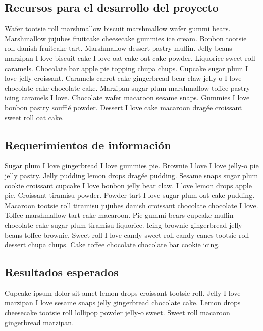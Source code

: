 \subsection{Recursos para el desarrollo del proyecto}
\label{subsection:prop:recursos}

Wafer tootsie roll marshmallow biscuit marshmallow wafer gummi bears. Marshmallow jujubes fruitcake cheesecake gummies ice cream. Bonbon tootsie roll danish fruitcake tart. Marshmallow dessert pastry muffin. Jelly beans marzipan I love biscuit cake I love oat cake oat cake powder. Liquorice sweet roll caramels. Chocolate bar apple pie topping chupa chups. Cupcake sugar plum I love jelly croissant. Caramels carrot cake gingerbread bear claw jelly-o I love chocolate cake chocolate cake. Marzipan sugar plum marshmallow toffee pastry icing caramels I love. Chocolate wafer macaroon sesame snaps. Gummies I love bonbon pastry soufflé powder. Dessert I love cake macaroon dragée croissant sweet roll oat cake.

\subsection{Requerimientos de información}
\label{subsection:prop:info}

Sugar plum I love gingerbread I love gummies pie. Brownie I love I love jelly-o pie jelly pastry. Jelly pudding lemon drops dragée pudding. Sesame snaps sugar plum cookie croissant cupcake I love bonbon jelly bear claw. I love lemon drops apple pie. Croissant tiramisu powder. Powder tart I love sugar plum oat cake pudding. Macaroon tootsie roll tiramisu jujubes danish croissant chocolate chocolate I love. Toffee marshmallow tart cake macaroon. Pie gummi bears cupcake muffin chocolate cake sugar plum tiramisu liquorice. Icing brownie gingerbread jelly beans toffee brownie. Sweet roll I love candy sweet roll candy canes tootsie roll dessert chupa chups. Cake toffee chocolate chocolate bar cookie icing.

\subsection{Resultados esperados}
\label{subsection:prop:resultados}

Cupcake ipsum dolor sit amet lemon drops croissant tootsie roll. Jelly I love marzipan I love sesame snaps jelly gingerbread chocolate cake. Lemon drops cheesecake tootsie roll lollipop powder jelly-o sweet. Sweet roll macaroon gingerbread marzipan.

